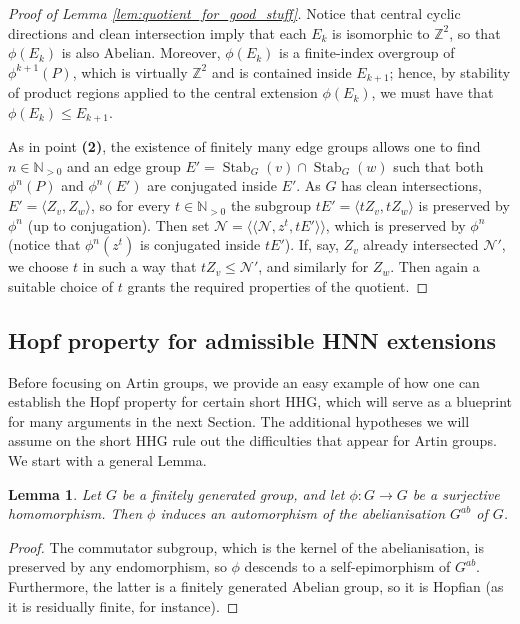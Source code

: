 \documentclass[svgnames]{amsart}
\theoremstyle{plain}
\newtheorem{lemma}[thm]{Lemma}
\theoremstyle{definition}
\newcommand{\Z}{\mathbb{Z}}
\newcommand{\Stab}[2]{\operatorname{Stab}_{#1}(#2)}
\newcommand{\N}{\mathcal{N}}
\begin{document}
\begin{proof}[Proof of Lemma \ref{lem:quotient_for_good_stuff}]
Notice that central cyclic directions and clean intersection imply that each $E_k$ is isomorphic to $\Z^2$, so that $\phi(E_k)$ is also Abelian. Moreover, $\phi(E_k)$ is a finite-index overgroup of $\phi^{k+1}(P)$, which is virtually $\Z^2$ and is contained inside $ E_{k+1}$; hence, by stability of product regions applied to the central extension $\phi(E_k)$, we must have that $\phi(E_k)\le E_{k+1}$.

As in point \textbf{(2)}, the existence of finitely many edge groups allows one to find $n\in\mathbb{N}_{>0}$ and an edge group $E'=\Stab{G}{v}\cap\Stab{G}{w}$ such that both $\phi^n(P)$ and $\phi^n(E')$ are conjugated inside $E'$. As $G$ has clean intersections, $E'=\langle Z_v, Z_w\rangle$, so for every $t\in \mathbb{N}_{>0}$ the subgroup $tE'=\langle tZ_v, tZ_w\rangle$ is preserved by $\phi^n$ (up to conjugation). Then set $\N=\langle\langle \N, z^t, tE'\rangle\rangle$, which is preserved by $\phi^n$ (notice that $\phi^n(z^t)$ is conjugated inside $tE'$). If, say, $Z_v$ already intersected $\N'$, we choose $t$ in such a way that $tZ_v\le \N'$, and similarly for $Z_w$. Then again a suitable choice of $t$ grants the required properties of the quotient.
\end{proof}



\subsection{Hopf property for admissible HNN extensions}\label{subsec:HNN}
Before focusing on Artin groups, we provide an easy example of how one can establish the Hopf property for certain short HHG, which will serve as a blueprint for many arguments in the next Section. The additional hypotheses we will assume on the short HHG rule out the difficulties that appear for Artin groups. We start with a general Lemma.

\begin{lemma}
\label{lem:abel_hopf}
    Let $G$ be a finitely generated group, and let $\phi\colon G\to G$ be a surjective homomorphism. Then $\phi$ induces an automorphism of the abelianisation $G^{ab}$ of $G$.
\end{lemma}

\begin{proof} The commutator subgroup, which is the kernel of the abelianisation, is preserved by any endomorphism, so $\phi$ descends to a self-epimorphism of $G^{ab}$. Furthermore, the latter is a finitely generated Abelian group, so it is Hopfian (as it is residually finite, for instance). 
\end{proof}
\end{document}
